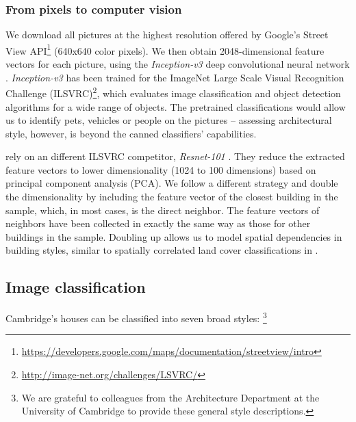 \documentclass[]{article}
\begin{document}
\hypertarget{from-pixels-to-computer-vision}{%
\subsubsection{From pixels to computer
vision}\label{from-pixels-to-computer-vision}}

We download all pictures at the highest resolution offered by Google's
Street View
API\footnote{\href{https://developers.google.com/maps/documentation/streetview/intro}{https://developers.google.com/maps/documentation/streetview/intro}}
(640x640 color pixels). We then obtain 2048-dimensional feature vectors
for each picture, using the \emph{Inception-v3} deep convolutional
neural network \autocite{Szegedy2015}. \emph{Inception-v3} has been
trained for the ImageNet Large Scale Visual Recognition Challenge
(ILSVRC)\footnote{\url{http://image-net.org/challenges/LSVRC/}}, which
evaluates image classification and object detection algorithms for a
wide range of objects. The pretrained classifications would allow us to
identify pets, vehicles or people on the pictures -- assessing
architectural style, however, is beyond the canned classifiers'
capabilities.

\textcite{GlaeserKincaidNaik2018} rely on an different ILSVRC
competitor, \emph{Resnet-101} \autocite{He2016}. They reduce the
extracted feature vectors to lower dimensionality (1024 to 100
dimensions) based on principal component analysis (PCA). We follow a
different strategy and double the dimensionality by including the
feature vector of the closest building in the sample, which, in most
cases, is the direct neighbor. The feature vectors of neighbors have
been collected in exactly the same way as those for other buildings in
the sample. Doubling up allows us to model spatial dependencies in
building styles, similar to spatially correlated land cover
classifications in \textcite{Ghimire2010a}.

\hypertarget{image-classification}{%
\subsection{Image classification}\label{image-classification}}

Cambridge's houses can be classified into seven broad styles:
\footnote{We are grateful to colleagues from the Architecture Department at the University of Cambridge to provide these general style descriptions.}
\end{document}
